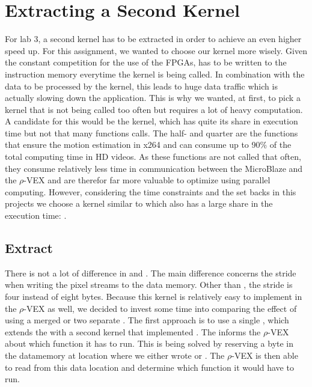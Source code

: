 
\section{Extracting a Second Kernel}
\label{sec:second}
For lab 3, a second kernel has to be extracted in order to achieve an even higher speed up. For this assignment, we wanted to choose our kernel more wisely. Given the constant competition for the use of the FPGAs,  has to be written to the instruction memory everytime the kernel is being called. In combination with the data to be processed by the kernel, this leads to huge data traffic which is actually slowing down the application. This is why we wanted, at first, to pick a kernel that is not being called too often but requires a lot of heavy computation. A candidate for this would be the  kernel, which has quite its share in execution time but not that many functions calls. The half- and quarter are the functions that ensure the motion estimation in x264 and can consume up to 90\% of the total computing time in HD videos. As these functions are not called that often, they consume relatively less time in communication between the MicroBlaze and the $\rho$-VEX and are therefor far more valuable to optimize using parallel computing. However, considering the time constraints and the set backs in this projects we choose a kernel similar to  which also has a large share in the execution time: .

\subsection{Extract }
\label{sec:4x4}
There is not a lot of difference in  and . The main difference concerns the stride when writing the pixel streams to the data memory. Other than , the stride is four instead of eight bytes. Because this kernel is relatively easy to implement in the $\rho$-VEX as well, we decided to invest some time into comparing the effect of using a merged  or two separate . The first approach is to use a single , which extends the  with a second kernel that implemented . The  informs the $\rho$-VEX about which function it has to run. This is being solved by reserving a byte in the datamemory at location  where we either wrote  or . The $\rho$-VEX is then able to read from this data location and determine which function it would have to run. 

